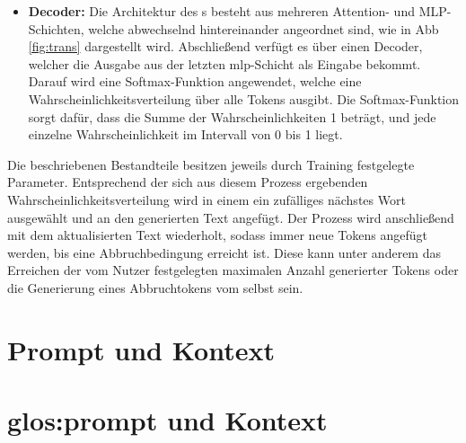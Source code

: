 \documentclass[../main.tex]{subfiles}
\begin{document}
\begin{itemize}
\item \textbf{Decoder:} Die Architektur des s besteht aus mehreren Attention- und MLP-Schichten, welche abwechselnd hintereinander angeordnet sind, wie in Abb \ref{fig:trans} dargestellt wird. Abschließend verfügt es über einen Decoder, welcher die Ausgabe aus der letzten \acrshort{mlp}-Schicht als Eingabe bekommt. Darauf wird eine Softmax-Funktion angewendet, welche eine Wahrscheinlichkeitsverteilung über alle Tokens ausgibt. Die Softmax-Funktion sorgt dafür, dass die Summe der Wahrscheinlichkeiten 1 beträgt, und jede einzelne Wahrscheinlichkeit im Intervall von 0 bis 1 liegt.\cite{architecture} 
\end{itemize}

Die beschriebenen Bestandteile besitzen jeweils durch Training festgelegte Parameter. Entsprechend der sich aus diesem Prozess ergebenden Wahrscheinlichkeitsverteilung wird in einem  ein zufälliges nächstes Wort ausgewählt und an den generierten Text angefügt. 
Der Prozess wird anschließend mit dem aktualisierten Text wiederholt, sodass immer neue Tokens angefügt werden, bis eine Abbruchbedingung erreicht ist. Diese kann unter anderem das 
Erreichen der vom Nutzer festgelegten maximalen Anzahl generierter Tokens oder die Generierung eines Abbruchtokens vom  selbst sein.\cite{architecture}\\


\section{Prompt und Kontext}

\section{\gls{glos:prompt} und Kontext}
\end{document}
